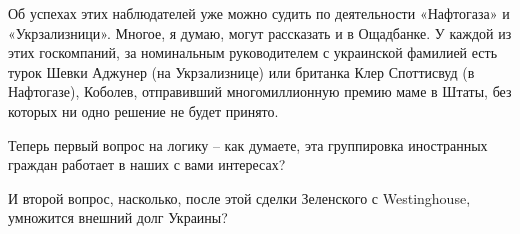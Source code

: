 Об успехах этих наблюдателей уже можно судить по деятельности «Нафтогаза» и
«Укрзализници». Многое, я думаю, могут рассказать и в Ощадбанке. У каждой из
этих госкомпаний, за номинальным руководителем с украинской фамилией есть турок
Шевки Аджунер (на Укрзализнице) или британка Клер Споттисвуд (в Нафтогазе),
Коболев, отправивший многомиллионную премию маме в Штаты, без которых ни одно
решение не будет принято.

Теперь первый вопрос на логику – как думаете, эта группировка иностранных
граждан работает в наших с вами интересах?

И второй вопрос, насколько, после этой сделки Зеленского с Westinghouse,
умножится внешний долг Украины?


